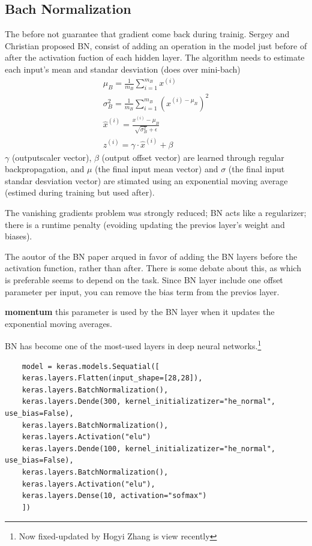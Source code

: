 \documentclass[12pt, a4paper]{book}
\begin{document}
\subsection*{Bach Normalization}
The before not guarantee that gradient come back during trainig. Sergey and Christian proposed BN, consist of adding an operation in the model just before of after the activation fuction of each hidden layer. The algorithm needs to estimate each input's mean and standar desviation (does over mini-bach)
\begin{eqnarray}
	\mu_B=\frac{1}{m_B}\sum^{m_B}_{i=1}x^{(i)}\\
	\sigma^{2}_B=\frac{1}{m_B}\sum_{i=1}^{m_B}\left(x^{(i)-\mu_B}\right)^2\\
	\hat{x}^{(i)}=\frac{x^(i)-\mu_B}{\sqrt{\sigma^{2}_B}+\epsilon}\\
	z^{(i)}=\gamma \cdot \hat{x}^{(i)}+\beta 
\end{eqnarray}
$\gamma$ (outputscaler vector), $\beta$ (output offset vector) are learned through regular backpropagation, and $\mu$ (the final input mean vector) and $\sigma$ (the final  input standar desviation vector) are stimated using an exponential moving average (estimed during training but used after).

The vanishing gradients problem was strongly reduced; BN acts like a regularizer; there is a runtime penalty (evoiding updating the previos layer's weight and biases).

The aoutor of the BN paper arqued in favor of adding the BN layers before the activation function, rather than after. There is some debate about this, as which is preferable seems to depend on the task. Since BN layer include one offset parameter per input, you can remove the bias term from the previos layer.

\textbf{momentum} this parameter is used by the BN layer when it updates the exponential moving averages.

BN has become one of the most-used layers in deep neural networks.\footnote{Now fixed-updated by Hogyi Zhang is view recently}
\begin{verbatim}
	model = keras.models.Sequatial([
	keras.layers.Flatten(input_shape=[28,28]),
	keras.layers.BatchNormalization(),
	keras.layers.Dende(300, kernel_initializatizer="he_normal", use_bias=False),
	keras.layers.BatchNormalization(),
	keras.layers.Activation("elu")
	keras.layers.Dende(100, kernel_initializatizer="he_normal", use_bias=False),
	keras.layers.BatchNormalization(),
	keras.layers.Activation("elu"),
	keras.layers.Dense(10, activation="sofmax")
	])
\end{verbatim}
\end{document}
